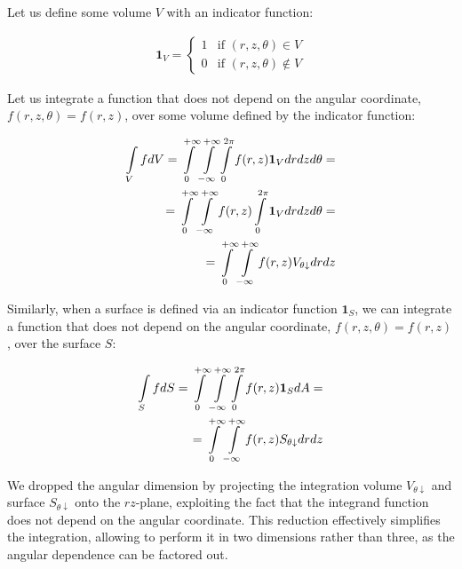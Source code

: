 \documentclass[10pt, a4paper]{article}
\begin{document}
\begin{multicols}{2}
Let us define some volume $V$ with an indicator function:

\begin{eqnarray}
    \bm{1}_V =
    \begin{cases}
        1 & \text{if } (r, z, \theta) \in V\\
        0 & \text{if } (r, z, \theta) \notin V
    \end{cases}
\end{eqnarray}

Let us integrate a function that does not depend on the angular coordinate, $f(r, z, \theta) = f(r, z)$, over some volume defined by the indicator function:

\begin{eqnarray}
    \label{eq:int_indicator_V}
    \begin{split}
        \int\limits_{V} f dV
        =\int\displaylimits_{0}^{+\infty} \int\displaylimits_{-\infty}^{+\infty} \int\displaylimits_{0}^{2\pi} f(r, z) \bm{1}_V  dr dz d\theta =\\
        =\int\displaylimits_{0}^{+\infty} \int\displaylimits_{-\infty}^{+\infty} f(r, z) \int\displaylimits_{0}^{2\pi}  \bm{1}_V dr dz d\theta =\\
        =\int\displaylimits_{0}^{+\infty} \int\displaylimits_{-\infty}^{+\infty} f(r, z)  V_{\theta \downarrow} dr dz
    \end{split}
\end{eqnarray}

Similarly, when a surface is defined via an indicator function $\bm{1}_S$, we can integrate a function that does not depend on the angular coordinate, $f(r, z, \theta) = f(r, z)$, over the surface $S$:

\begin{eqnarray}
    \label{eq:int_indicator_S}
    \begin{split}
        \int\limits_{S} f dS = \int\displaylimits_{0}^{+\infty} \int\displaylimits_{-\infty}^{+\infty} \int\displaylimits_{0}^{2\pi} f(r, z) \bm{1}_S  dA =\\
        =\int\displaylimits_{0}^{+\infty} \int\displaylimits_{-\infty}^{+\infty} f(r, z)  S_{\theta \downarrow} dr dz
    \end{split}
\end{eqnarray}

We dropped the angular dimension by projecting the integration volume $V_{\theta \downarrow}$ and surface $S_{\theta \downarrow}$ onto the $rz$-plane, exploiting the fact that the integrand function does not depend on the angular coordinate.
This reduction effectively simplifies the integration, allowing to perform it in two dimensions rather than three, as the angular dependence can be factored out.


\end{multicols}
\end{document}
